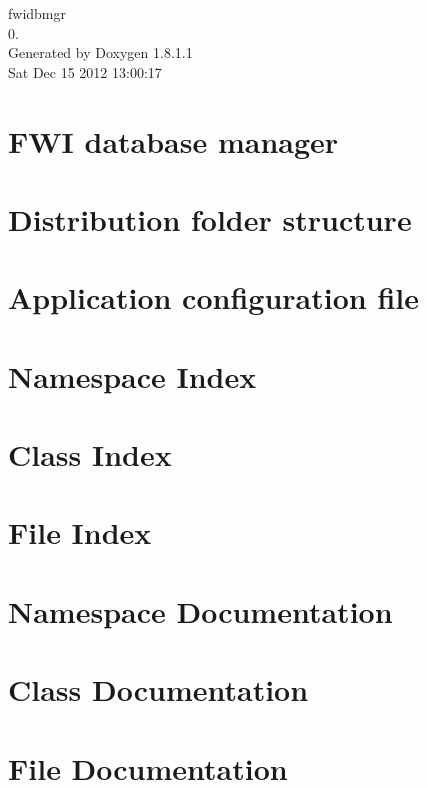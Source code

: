 \documentclass{book}
\begin{document}
\hypersetup{pageanchor=false,citecolor=blue}
\begin{titlepage}
\vspace*{7cm}
\begin{center}
{\Large fwidbmgr \\[1ex]\large 0. }\\
\vspace*{1cm}
{\large Generated by Doxygen 1.8.1.1}\\
\vspace*{0.5cm}
{\small Sat Dec 15 2012 13:00:17}\\
\end{center}
\end{titlepage}
\clearemptydoublepage
{}
\tableofcontents
\clearemptydoublepage
{}
\hypersetup{pageanchor=true,citecolor=blue}
\chapter{F\-W\-I database manager}
\label{index}\hypertarget{index}{}
\chapter{Distribution folder structure}
\label{folder_struct}
\hypertarget{folder_struct}{}

\chapter{Application configuration file}
\label{app_config}
\hypertarget{app_config}{}

\chapter{Namespace Index}

\chapter{Class Index}

\chapter{File Index}

\chapter{Namespace Documentation}


\chapter{Class Documentation}





\chapter{File Documentation}









\printindex
\end{document}
